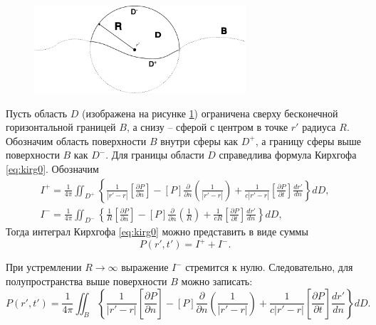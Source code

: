 \documentclass[a4paper, fontsize=14pt]{article}
\begin{document}
	\begin{figure}[h]
		\centering
		\includegraphics[width=0.7\textwidth]{kir_inf.pdf}
		\caption{}
		\label{fig:kir_inf}
	\end{figure}
	
	Пусть область $D$ (изображена на рисунке \ref{fig:kir_inf}) ограничена сверху бесконечной горизонтальной границей $B$, а снизу -- сферой с центром в точке $r'$ радиуса $R$. Обозначим область поверхности $B$ внутри сферы как $D^+$, а границу сферы выше поверхности $B$ как $D^-$. Для границы области $D$ справедлива формула Кирхгофа \eqref{eq:kirg0}.
	Обозначим 
	\begin{gather*}
		I^+=\frac{1}{4\pi}\iint_{D^+}^{}\left\{\frac{1}{|r'-r|}\left[\frac{\partial P}{\partial n}\right]-\left[P\right]\frac{\partial}{\partial n}\left(\frac{1}{|r'-r|}\right)+\frac{1}{c |r'-r|}\left[\frac{\partial P}{\partial t}\right]\frac{d r'}{d n}\right\}d D, \\
		I^-=\frac{1}{4\pi}\iint_{D^-}^{}\left\{\frac{1}{R}\left[\frac{\partial P}{\partial n}\right]-\left[P\right]\frac{\partial}{\partial n}\left(\frac{1}{R}\right)+\frac{1}{c R}\left[\frac{\partial P}{\partial t}\right]\frac{d r'}{d n}\right\}d D,	
	\end{gather*}
	Тогда интеграл Кирхгофа \eqref{eq:kirg0} можно представить в виде суммы 
	\begin{equation*}
		P(r',t') = I^+ +I^-.
	\end{equation*}
	
	При устремлении $R \to \infty$ выражение $I^-$ стремится к нулю. Следовательно, для полупространства выше поверхности $B$ можно записать:
	\begin{equation}
		P\left(r',t'\right)=\frac{1}{4\pi}\iint_{B}^{}\left\{\frac{1}{|r'-r|}\left[\frac{\partial P}{\partial n}\right]-\left[P\right]\frac{\partial}{\partial n}\left(\frac{1}{|r'-r|}\right)+\frac{1}{c |r'-r|}\left[\frac{\partial P}{\partial t}\right]\frac{d r'}{d n}\right\}d D.
	\end{equation}
	
\end{document}
